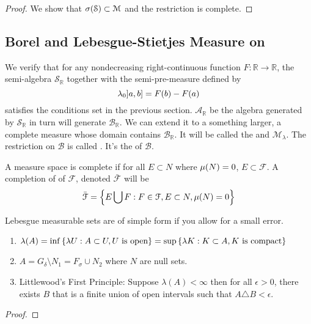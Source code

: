 \begin{proof}
    We show that \(\sigma\pqty{\mathcal{S}}\subset \mathcal{M}\) and the restriction is complete. 
\end{proof}

\subsection{Borel and Lebesgue-Stietjes Measure on }

We verify that for any nondecreasing right-continuous function \(F: \mathbb{R}\to \mathbb{R}\), the semi-algebra \(\mathcal{S}_{\mathbb{R}}\) together with the semi-pre-measure defined by 
\begin{equation*}
    \lambda_{0} \linterval{a}{b} = F(b) - F(a)
\end{equation*}
satisfies the conditions set in the previous section. \(\mathcal{A}_{\mathbb{R}}\) be the algebra generated by \(\mathcal{S}_{\mathbb{R}}\) in turn will generate \(\mathcal{B}_{\mathbb{R}}\). We can extend it to a something larger, a complete measure whose domain contains \(\mathcal{B}_{\mathbb{R}}\). It will be called the  and  \(\mathcal{M}_{\lambda}\). The restriction on \(\mathcal{B}\) is called . It's the  of \(\mathcal{B}\).

A measure space is complete if for all \(E\subset N\) where \(\mu\pqty{N}=0\), \(E\subset \mathcal{F}\). A completion of of \(\mathcal{F}\), denoted \(\bar{\mathcal{F}}\) will be 
\begin{equation*}
    \bar{\mathcal{F}} = \Bqty{E \cup F: F\in \mathcal{F}, E\subset N, \mu(N) = 0}
\end{equation*}


\begin{thm}
    Lebesgue measurable sets are of simple form if you allow for a small error.

    \begin{enumerate}
        \item \(\lambda(A) = \inf\Bqty{\lambda U:  A \subset U, U  \text{ is open}} = \sup\Bqty{\lambda K : K \subset A, K \text{ is compact}}\)
        \item \(A = G_{\delta} \setminus N_{1}= F_{\sigma} \cup N_{2}\) where \(N\) are null sets.  
        \item Littlewood's First Principle: Suppose \(\lambda(A) < \infty\) then for all \(\epsilon > 0\), there exists \(B\) that is a finite union of open intervals such that \(A \triangle B < \epsilon\). 
    \end{enumerate}
\end{thm}
\begin{proof}
    
\end{proof}

